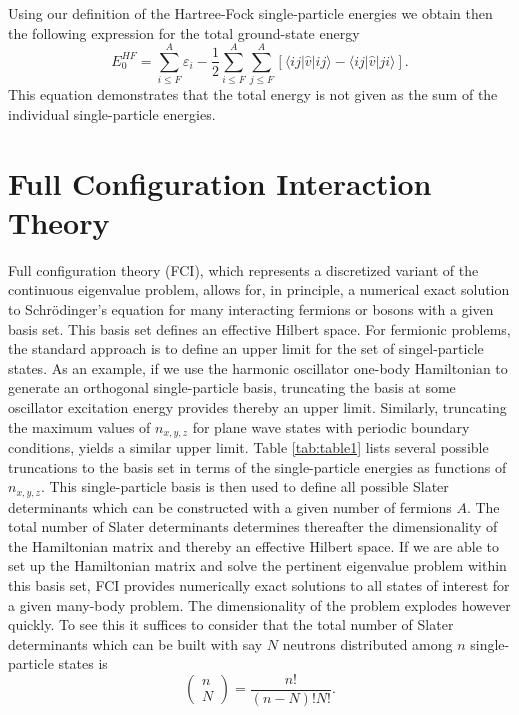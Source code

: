Using our definition of the Hartree-Fock single-particle energies we
obtain then the following expression for the total ground-state energy
\[
  E_0^{HF}
  = \sum_{i\le F}^A \varepsilon_i - \frac{1}{2}\sum_{i\le F}^A\sum_{j \le F}^A\left[\langle ij |\hat{v}|ij \rangle-\langle ij|\hat{v}|ji\rangle\right].
\]
This equation demonstrates that the total energy is not given as the sum of the individual single-particle energies.

\section{Full Configuration Interaction Theory}

Full configuration theory (FCI), which represents a discretized variant of
the continuous eigenvalue problem, allows for, in principle, a numerical exact
solution to Schr\"odinger's equation for many interacting fermions or bosons 
with a given basis set. This basis set defines an effective Hilbert space. 
For fermionic problems, the standard approach is to define an upper limit for the set of singel-particle states. As an example, if we use the harmonic oscillator one-body Hamiltonian to generate an orthogonal single-particle basis, truncating the basis at some oscillator excitation energy provides thereby an upper limit.
Similarly, truncating the maximum values of $n_{x,y,z}$ for plane wave states with periodic boundary conditions, yields a similar upper limit.
Table \ref{tab:table1} lists several possible truncations to the basis set in terms of the single-particle energies as functions of $n_{x,y,z}$.
This single-particle basis is then used to define all possible Slater determinants which can be constructed with a given number of fermions $A$.  
The total number of Slater determinants determines thereafter the dimensionality of the Hamiltonian matrix and thereby an effective Hilbert space.
If we are able to set up 
the Hamiltonian matrix and solve the pertinent eigenvalue problem within this basis set, FCI provides numerically exact solutions to all states of interest for 
a given  many-body problem. The dimensionality of the problem explodes however quickly. To see this it suffices to consider that the
total number of Slater determinants which can be built with say $N$ neutrons distributed among $n$ single-particle states is
\[
\left (\begin{array}{c} n \\ N\end{array} \right) =\frac{n!}{(n-N)!N!}. 
\]
